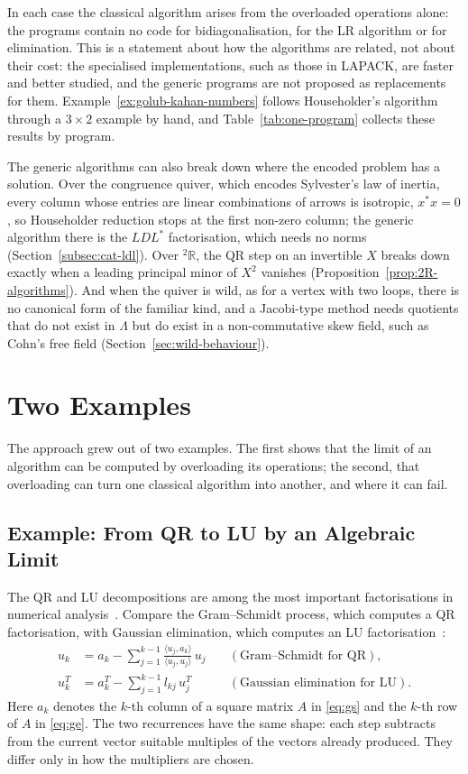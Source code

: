 \documentclass[12pt, a4paper]{report}
\theoremstyle{plain}
\theoremstyle{definition}
\theoremstyle{remark}
\theoremstyle{plain}
\newcommand{\twoR}{{}^{2}\mathbb{R}}
\begin{document}
In each case the classical algorithm arises from the overloaded operations alone: the programs contain no code for bidiagonalisation, for the LR algorithm or for elimination. This is a statement about how the algorithms are related, not about their cost: the specialised implementations, such as those in LAPACK, are faster and better studied, and the generic programs are not proposed as replacements for them. Example~\ref{ex:golub-kahan-numbers} follows Householder's algorithm through a $3\times2$ example by hand, and Table~\ref{tab:one-program} collects these results by program.

The generic algorithms can also break down where the encoded problem has a solution. Over the congruence quiver, which encodes Sylvester's law of inertia, every column whose entries are linear combinations of arrows is isotropic, $x^*x=0$, so Householder reduction stops at the first non-zero column; the generic algorithm there is the $LDL^*$ factorisation, which needs no norms (Section~\ref{subsec:cat-ldl}). Over $\twoR$, the QR step on an invertible $X$ breaks down exactly when a leading principal minor of $X^2$ vanishes (Proposition~\ref{prop:2R-algorithms}). And when the quiver is wild, as for a vertex with two loops, there is no canonical form of the familiar kind, and a Jacobi-type method needs quotients that do not exist in $\Lambda$ but do exist in a non-commutative skew field, such as Cohn's free field (Section~\ref{sec:wild-behaviour}).

\section{Two Examples}
\label{sec:motivation}
The approach grew out of two examples. The first shows that the limit of an algorithm can be computed by overloading its operations; the second, that overloading can turn one classical algorithm into another, and where it can fail.

\subsection{Example: From QR to LU by an Algebraic Limit}
\label{subsec:qr-lu}
The QR and LU decompositions are among the most important factorisations in numerical analysis~\cite{GolubVanLoan2013}. Compare the Gram--Schmidt process, which computes a QR factorisation, with Gaussian elimination, which computes an LU factorisation~\cite{GolubVanLoan2013}:
\begin{align}
    u_k &= a_k - \sum_{j=1}^{k-1} \frac{\langle u_j, a_k\rangle}{\langle u_j, u_j\rangle}\, u_j \quad &(\text{Gram--Schmidt for QR}), \label{eq:gs} \\
    u_k^T &= a_k^T - \sum_{j=1}^{k-1} l_{kj}\, u_j^T \quad &(\text{Gaussian elimination for LU}). \label{eq:ge}
\end{align}
Here $a_k$ denotes the $k$-th column of a square matrix $A$ in \eqref{eq:gs} and the $k$-th row of $A$ in \eqref{eq:ge}. The two recurrences have the same shape: each step subtracts from the current vector suitable multiples of the vectors already produced. They differ only in how the multipliers are chosen.
\end{document}
